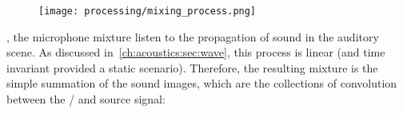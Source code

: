 \begin{figure}[t]
    \begin{fullwidthfig}
        \texttt{[image: processing/mixing\_process.png]}
    \end{fullwidthfig}

    \vspace{-\baselineskip}\vspace{-\baselineskip}
    \label{fig:processing:mixing}
\end{figure}

, the microphone mixture listen to the propagation of sound in the auditory scene.
As discussed in~\cref{ch:acoustics:sec:wave}, this process is linear (and time invariant provided a static scenario).
Therefore, the resulting mixture is the simple summation of the sound images,
which are the collections of convolution between the \RIRs/ and source signal:
